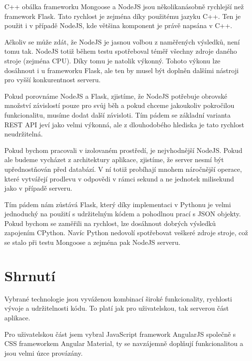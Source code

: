 C++ obálka frameworku Mongoose a NodeJS jsou několikanásobně rychlejší než framework Flask. Tato rychlost je zejména díky použitému jazyku C++. Ten je použit i v případě NodeJS, kde většina komponent je právě napsána v C++. 

Ačkoliv se může zdát, že NodeJS je jasnou volbou z naměřených výsledků, není tomu tak. NodeJS totiž během testu spotřeboval téměř všechny zdroje daného stroje (zejména CPU). Díky tomu je natolik výkonný. Tohoto výkonu lze dosáhnout i u frameworku Flask, ale ten by musel být doplněn dalšími nástroji pro vyšší konkurentnost serveru.

Pokud porovnáme NodeJS a Flask, zjistíme, že NodeJS potřebuje obrovské množství závislostí pouze pro svůj běh a pokud chceme jakoukoliv pokročilou funkcionalitu, musíme dodat další závisloti. Tím pádem se základní varianta REST API jeví jako velmi výkonná, ale z dlouhodobého hlediska je tato rychlost neudržitelná.

Pokud bychom pracovali v izolovaném prostředí, je nejvhodnější NodeJS. Pokud ale budeme vycházet z architektury aplikace, zjistíme, že server nesmí být upřednostňován před databází. V ní totiž probíhají mnohem náročnější operace, které vytvářejí prodlevu v odpovědi v rámci sekund a ne jednotek milisekund jako v případě serveru. 

Tím pádem nám zůstává Flask, který díky implementaci v Pythonu je velmi jednoduchý na použití s udržitelným kódem a pohodlnou prací s JSON objekty. Pokud bychom se zaměřili na rychlost, lze dosáhnout dobrých výsledků zapojením CPython. Navíc Python nedovolí spotřebovat veškeré zdroje stroje, což se stalo při testu Mongoose a zejména pak NodeJS serveru.


\section{Shrnutí}

Vybrané technologie jsou vyváženou kombinací široké funkcionality, rychlosti vývoje a udržitelnosti kódu. To platí jak pro uživatelskou, tak serverou část aplikace.

Pro uživatelskou část jsem vybral JavaScript framework AngularJS společně s CSS frameworkem Angular Material, ty se navzájemně doplňují funkcionalitou a jsou velmi úzce provázány.

